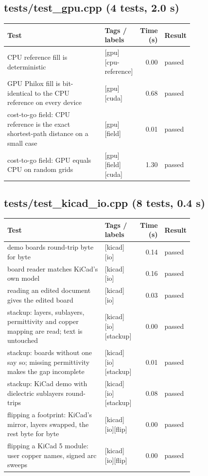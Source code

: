 \subsection*{tests/\allowbreak{}test\_\allowbreak{}gpu.cpp (4 tests, 2.0 s)}
\begin{longtable}{@{}p{0.57\linewidth}p{0.19\linewidth}rl@{}}
\toprule Test & Tags / labels & Time (s) & Result \\ \midrule \endhead
CPU reference fill is deterministic & {\footnotesize [gpu][cpu-reference]} & 0.00 & passed \\
GPU Philox fill is bit-identical to the CPU reference on every device & {\footnotesize [gpu][cuda]} & 0.68 & passed \\
cost-to-go field: CPU reference is the exact shortest-path distance on a small case & {\footnotesize [gpu][field]} & 0.01 & passed \\
cost-to-go field: GPU equals CPU on random grids & {\footnotesize [gpu][field][cuda]} & 1.30 & passed \\
\bottomrule\end{longtable}
\subsection*{tests/\allowbreak{}test\_\allowbreak{}kicad\_\allowbreak{}io.cpp (8 tests, 0.4 s)}
\begin{longtable}{@{}p{0.57\linewidth}p{0.19\linewidth}rl@{}}
\toprule Test & Tags / labels & Time (s) & Result \\ \midrule \endhead
demo boards round-trip byte for byte & {\footnotesize [kicad][io]} & 0.14 & passed \\
board reader matches KiCad's own model & {\footnotesize [kicad][io]} & 0.16 & passed \\
reading an edited document gives the edited board & {\footnotesize [kicad][io]} & 0.03 & passed \\
stackup: layers, sublayers, permittivity and copper mapping are read; text is untouched & {\footnotesize [kicad][io][stackup]} & 0.00 & passed \\
stackup: boards without one say so; missing permittivity makes the gap incomplete & {\footnotesize [kicad][io][stackup]} & 0.01 & passed \\
stackup: KiCad demo with dielectric sublayers round-trips & {\footnotesize [kicad][io][stackup]} & 0.08 & passed \\
flipping a footprint: KiCad's mirror, layers swapped, the rest byte for byte & {\footnotesize [kicad][io][flip]} & 0.00 & passed \\
flipping a KiCad 5 module: user copper names, signed arc sweeps & {\footnotesize [kicad][io][flip]} & 0.00 & passed \\
\bottomrule\end{longtable}
